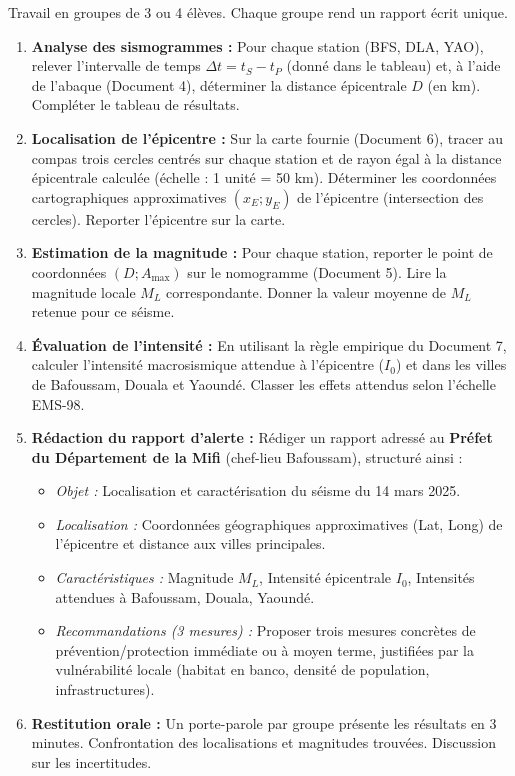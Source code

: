 \documentclass[11pt]{article}
\newcounter{popsec}
\newcounter{popsub}
\newcommand{\courssub}[1]{%
  \stepcounter{popsub}%
  \par\vspace{9pt}\noindent{\popxbold\fontsize{11.5}{13}\selectfont\color{popink}{\color{poporange}\thepopsec.\thepopsub}\hspace{6pt}#1}\par\nopagebreak\vspace{4pt}
}
\begin{document}
\courssub{Consignes}
Travail en groupes de 3 ou 4 élèves. Chaque groupe rend un rapport écrit unique.
\begin{enumerate}
    \item \textbf{Analyse des sismogrammes :} Pour chaque station (BFS, DLA, YAO), relever l'intervalle de temps $\Delta t = t_S - t_P$ (donné dans le tableau) et, à l'aide de l'abaque (Document 4), déterminer la distance épicentrale $D$ (en km). Compléter le tableau de résultats.
    \item \textbf{Localisation de l'épicentre :} Sur la carte fournie (Document 6), tracer au compas trois cercles centrés sur chaque station et de rayon égal à la distance épicentrale calculée (échelle : 1 unité = 50 km). Déterminer les coordonnées cartographiques approximatives $(x_E ; y_E)$ de l'épicentre (intersection des cercles). Reporter l'épicentre sur la carte.
    \item \textbf{Estimation de la magnitude :} Pour chaque station, reporter le point de coordonnées $(D ; A_{\text{max}})$ sur le nomogramme (Document 5). Lire la magnitude locale $M_L$ correspondante. Donner la valeur moyenne de $M_L$ retenue pour ce séisme.
    \item \textbf{Évaluation de l'intensité :} En utilisant la règle empirique du Document 7, calculer l'intensité macrosismique attendue à l'épicentre ($I_0$) et dans les villes de Bafoussam, Douala et Yaoundé. Classer les effets attendus selon l'échelle EMS-98.
    \item \textbf{Rédaction du rapport d'alerte :} Rédiger un rapport adressé au \textbf{Préfet du Département de la Mifi} (chef-lieu Bafoussam), structuré ainsi :
    \begin{itemize}
        \item \textit{Objet :} Localisation et caractérisation du séisme du 14 mars 2025.
        \item \textit{Localisation :} Coordonnées géographiques approximatives (Lat, Long) de l'épicentre et distance aux villes principales.
        \item \textit{Caractéristiques :} Magnitude $M_L$, Intensité épicentrale $I_0$, Intensités attendues à Bafoussam, Douala, Yaoundé.
        \item \textit{Recommandations (3 mesures) :} Proposer trois mesures concrètes de prévention/protection immédiate ou à moyen terme, justifiées par la vulnérabilité locale (habitat en banco, densité de population, infrastructures).
    \end{itemize}
    \item \textbf{Restitution orale :} Un porte-parole par groupe présente les résultats en 3 minutes. Confrontation des localisations et magnitudes trouvées. Discussion sur les incertitudes.
\end{enumerate}
\end{document}
